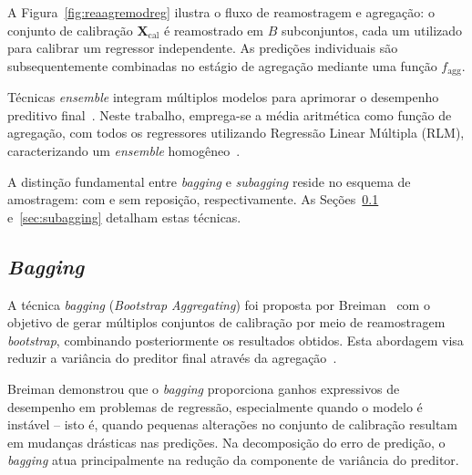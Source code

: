 A Figura~\ref{fig:reaagremodreg} ilustra o fluxo de reamostragem e agregação: o conjunto de calibração $\mathbf{X}_{\mathrm{cal}}$ é reamostrado em $B$ subconjuntos, cada um utilizado para calibrar um regressor independente. As predições individuais são subsequentemente combinadas no estágio de agregação mediante uma função $f_{\text{agg}}$.

Técnicas \textit{ensemble} integram múltiplos modelos para aprimorar o desempenho preditivo final~\cite{Opitz1999}. Neste trabalho, emprega-se a média aritmética como função de agregação, com todos os regressores utilizando Regressão Linear Múltipla (RLM), caracterizando um \textit{ensemble} homogêneo~\cite{liu2025,iterative_mishra_2023,styawan2024}.

A distinção fundamental entre \textit{bagging} e \textit{subagging} reside no esquema de amostragem: com e sem reposição, respectivamente. As Seções~\ref{sec:bagging} e~\ref{sec:subagging} detalham estas técnicas.

\subsection{\textit{Bagging}}
\label{sec:bagging}

A técnica \textit{bagging} (\textit{Bootstrap Aggregating}) foi proposta por Breiman~\cite{Breiman1996} com o objetivo de gerar múltiplos conjuntos de calibração por meio de reamostragem \textit{bootstrap}, combinando posteriormente os resultados obtidos. Esta abordagem visa reduzir a variância do preditor final através da agregação~\cite{Breiman1996,Shabbir2024,HONG2020,nazhao2018,rathnayake2022}.


Breiman demonstrou que o \textit{bagging} proporciona ganhos expressivos de 
desempenho em problemas de regressão, especialmente quando o modelo é instável 
-- isto é, quando pequenas alterações no conjunto de calibração resultam em 
mudanças drásticas nas predições. Na decomposição do erro de predição, o 
\textit{bagging} atua principalmente na redução da componente de variância do 
preditor.

